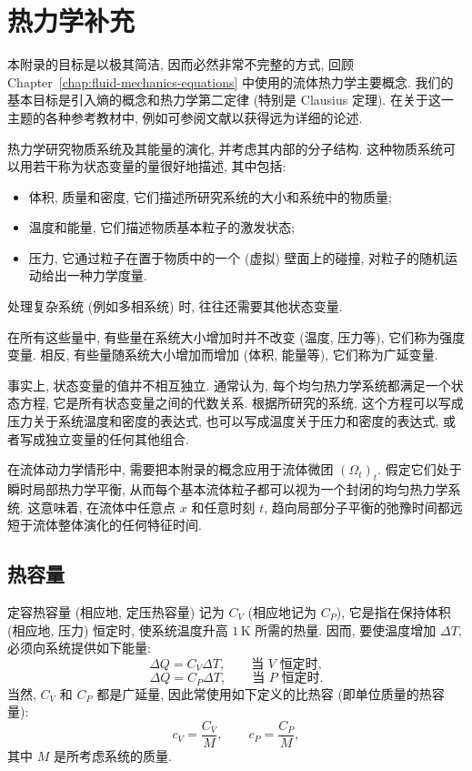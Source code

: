 \clearpage
\section{热力学补充}
\label{chap:appendix-thermodynamics-supplement}
\label{app:thermodynamics-supplement}
\renewcommand{\thestatement}{B.1.\arabic{statement}}
\renewcommand{\theHstatement}{appB.sec01.\arabic{statement}}
\setcounter{statement}{0}
\renewcommand{\theequation}{B.\arabic{equation}}
\renewcommand{\theHequation}{appB.\arabic{equation}}
\setcounter{equation}{0}

本附录的目标是以极其简洁, 因而必然非常不完整的方式, 回顾 Chapter~\ref{chap:fluid-mechanics-equations} 中使用的流体热力学主要概念. 我们的基本目标是引入熵的概念和热力学第二定律 (特别是 Clausius 定理). 在关于这一主题的各种参考教材中, 例如可参阅文献以获得远为详细的论述.

热力学研究物质系统及其能量的演化, 并考虑其内部的分子结构. 这种物质系统可以用若干称为状态变量的量很好地描述, 其中包括:
\begin{itemize}
 \item 体积, 质量和密度, 它们描述所研究系统的大小和系统中的物质量;
 \item 温度和能量, 它们描述物质基本粒子的激发状态;
 \item 压力, 它通过粒子在置于物质中的一个 (虚拟) 壁面上的碰撞, 对粒子的随机运动给出一种力学度量.
\end{itemize}
处理复杂系统 (例如多相系统) 时, 往往还需要其他状态变量.

在所有这些量中, 有些量在系统大小增加时并不改变 (温度, 压力等), 它们称为强度变量. 相反, 有些量随系统大小增加而增加 (体积, 能量等), 它们称为广延变量.

事实上, 状态变量的值并不相互独立. 通常认为, 每个均匀热力学系统都满足一个状态方程, 它是所有状态变量之间的代数关系. 根据所研究的系统, 这个方程可以写成压力关于系统温度和密度的表达式, 也可以写成温度关于压力和密度的表达式, 或者写成独立变量的任何其他组合.

在流体动力学情形中, 需要把本附录的概念应用于流体微团 $(\Omega_t)_t$. 假定它们处于瞬时局部热力学平衡, 从而每个基本流体粒子都可以视为一个封闭的均匀热力学系统. 这意味着, 在流体中任意点 $x$ 和任意时刻 $t$, 趋向局部分子平衡的弛豫时间都远短于流体整体演化的任何特征时间.

\subsection{热容量}
\label{sec:app-b-heat-capacity}

\begin{Definition}
\label{def:app-b-heat-capacity}
定容热容量 (相应地, 定压热容量) 记为 $C_V$ (相应地记为 $C_P$), 它是指在保持体积 (相应地, 压力) 恒定时, 使系统温度升高 $1\,\mathrm K$ 所需的热量. 因而, 要使温度增加 $\Delta T$, 必须向系统提供如下能量:
\[
 \Delta Q=C_V\Delta T,\qquad\text{当 }V\text{ 恒定时},
\]
\[
 \Delta Q=C_P\Delta T,\qquad\text{当 }P\text{ 恒定时}.
\]
当然, $C_V$ 和 $C_P$ 都是广延量, 因此常使用如下定义的比热容 (即单位质量的热容量):
\[
 c_V=\frac{C_V}{M},\qquad c_P=\frac{C_P}{M},
\]
其中 $M$ 是所考虑系统的质量.
\end{Definition}
